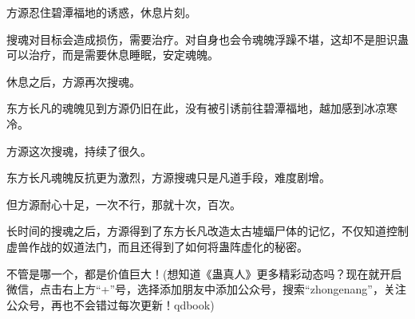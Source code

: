 \begin{this_body}
方源忍住碧潭福地的诱惑，休息片刻。

搜魂对目标会造成损伤，需要治疗。对自身也会令魂魄浮躁不堪，这却不是胆识蛊可以治疗，而是需要休息睡眠，安定魂魄。

休息之后，方源再次搜魂。

东方长凡的魂魄见到方源仍旧在此，没有被引诱前往碧潭福地，越加感到冰凉寒冷。

方源这次搜魂，持续了很久。

东方长凡魂魄反抗更为激烈，方源搜魂只是凡道手段，难度剧增。

但方源耐心十足，一次不行，那就十次，百次。

长时间的搜魂之后，方源得到了东方长凡改造太古墟蝠尸体的记忆，不仅知道控制虚兽作战的奴道法门，而且还得到了如何将蛊阵虚化的秘密。

不管是哪一个，都是价值巨大！(想知道《蛊真人》更多精彩动态吗？现在就开启微信，点击右上方“+”号，选择添加朋友中添加公众号，搜索“zhongenang”，关注公众号，再也不会错过每次更新！qdbook)

\end{this_body}

